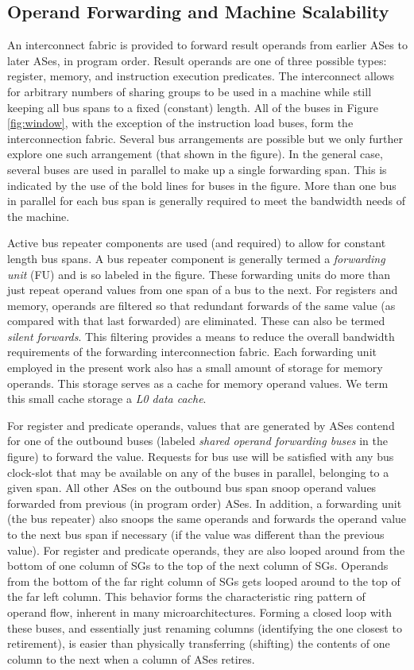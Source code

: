 \documentclass[10pt,dvips]{article}
\begin{document}
\subsection{Operand Forwarding and Machine Scalability}
%
An interconnect fabric is provided to forward result
operands from earlier ASes to 
later ASes, in program order.  
Result operands are one of three possible types: register, memory, and
instruction execution predicates.
The interconnect allows for arbitrary numbers of sharing
groups to be used in a machine while still keeping all bus
spans to a fixed (constant) length.
All of the buses in
Figure \ref{fig:window}, with the exception of the instruction
load buses, form the interconnection fabric.
Several bus arrangements are possible but we only
further explore one such arrangement (that shown in the figure).
In the general case, several buses are used in parallel to make up
a single forwarding span.
This is indicated by the use of the
bold lines for buses in the figure.
More than one
bus in parallel for each bus span is generally required to meet
the bandwidth needs of the machine.

Active bus repeater components are used (and required) to 
allow for constant length bus spans.
A bus repeater component is generally termed a
\textit{forwarding unit} (FU) and is so labeled in the figure.
These forwarding units do more than just repeat operand values from
one span of a bus to the next.
For registers and memory, operands are filtered so that
redundant forwards of the same value (as compared with that last forwarded)
are eliminated.  These can also be termed \textit{silent forwards}.
This filtering provides a means to reduce the overall bandwidth
requirements of the forwarding interconnection fabric.
Each forwarding unit employed in the present work also has a small
amount of storage for memory operands.
This storage serves as a cache for memory operand values.
We term this small cache storage a \textit{L0 data cache}.

For register and predicate operands, values that are generated
by ASes contend for one of the outbound buses
(labeled \textit{shared operand forwarding buses} in the figure) 
to forward the value.
Requests for bus use will be satisfied with any bus clock-slot that may be
available on any of the buses in parallel, belonging to
a given span.  All other ASes on the outbound bus span snoop
operand values forwarded from previous (in program order)
ASes.  In addition, a forwarding unit (the bus repeater) also
snoops the same operands and forwards the operand value to the
next bus span if necessary (if the value was different than the previous
value).  For register and predicate operands, they are also
looped around from the bottom of one column of SGs
to the top of the next column of SGs.  
Operands from the bottom of the
far right column of SGs gets looped around to the
top of the far left column.  
This behavior forms the characteristic ring pattern of operand flow,
inherent in many microarchitectures.  Forming a closed loop
with these buses, and essentially just renaming columns (identifying the
one closest to retirement), is easier than physically transferring
(shifting) the contents of one column to the next when a column
of ASes retires.
\end{document}
